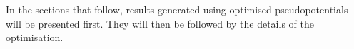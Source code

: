 \documentclass[aip,reprint,nofootinbib]{revtex4-1}
\begin{document}
In the sections that follow, results generated using optimised pseudopotentials will be presented first. They will then be followed by the details of the optimisation.

% 		 
%
%  		  
% 		 
% 		 
\end{document}
